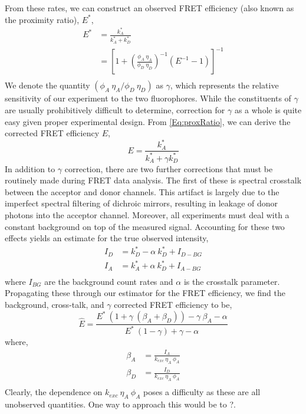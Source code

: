 \documentclass{article}
\begin{document}
From these rates, we can construct an observed FRET efficiency (also
known as the proximity ratio), $E^*$,
\begin{align*}
  E^* & = \frac{k^*_A}{k^*_A + k^*_D} \\
      & = \left[ 1 + \left(\frac{\phi_A~\eta_A}{\phi_D~\eta_D}\right)^{-1} (E^{-1} - 1) \right]^{-1} \\ \label{Eq:proxRatio}
\end{align*}
We denote the quantity $(\phi_A~\eta_A / \phi_D~\eta_D)$ as $\gamma$,
which represents the relative sensitivity of our experiment to the two
fluorophores. While the constituents of $\gamma$ are usually
prohibitively difficult to determine, correction for $\gamma$ as a
whole is quite easy given proper experimental design. From
\eqref{Eq:proxRatio}, we can derive the corrected FRET efficiency $E$,
\begin{equation}
  E = \frac{k^*_A}{k^*_A + \gamma k^*_D}
  \label{Eq:gammaFretEff}
\end{equation}
In addition to $\gamma$ correction, there are two further corrections that
must be routinely made during FRET data analysis. The first of these
is spectral crosstalk between the acceptor and donor channels. This
artifact is largely due to the imperfect spectral filtering of
dichroic mirrors, resulting in leakage of donor photons into the
acceptor channel. Moreover, all experiments must deal with a constant
background on top of the measured signal. Accounting for these two effects
yields an estimate for the true observed intensity,
\begin{align*}
  I_D & = k^*_D - \alpha~k^*_D + I_{D-BG} \\
  I_A & = k^*_A + \alpha~k^*_D + I_{A-BG} \\
\end{align*} 
where $I_{BG}$ are the background count rates and $\alpha$ is the crosstalk
parameter. Propagating these through our estimator for the FRET
efficiency, we find the background, cross-talk, and $\gamma$ corrected
FRET efficiency to be,
\[
  \hat E = \frac{E^* ~ \left(1 + \gamma ~ (\beta_A + \beta_D)\right) - \gamma~\beta_A - \alpha}
    {E^* ~ (1 - \gamma) + \gamma - \alpha}
\]
where,
\begin{align*}
  \beta_A & = \frac{I_A}{k_{exc}~\eta_A~\phi_A} \\
  \beta_D & = \frac{I_D}{k_{exc}~\eta_A~\phi_A} \\
\end{align*}
Clearly, the dependence on $k_{exc}~\eta_A~\phi_A$ poses a difficulty
as these are all unobserved quantities. One way to approach this would
be to ?.
\end{document}
